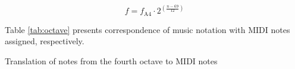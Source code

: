 \documentclass[a4paper, 11pt, twoside]{report}
\theoremstyle{definition}
\begin{document}
\begin{equation}
    f = f_{\text{A4}} \cdot 2^{\left (\frac{n - 69}{12} \right )}
\end{equation} \par

Table \ref{tab:octave} presents correspondence of music notation with MIDI notes assigned, respectively.  \par


\begin{table}[H]
    \caption{Translation of notes from the fourth octave to MIDI notes \cite{MIDI_notes}}
    \label{tab:octave}
\end{table}
\addtocounter{table}{-1}
\end{document}

